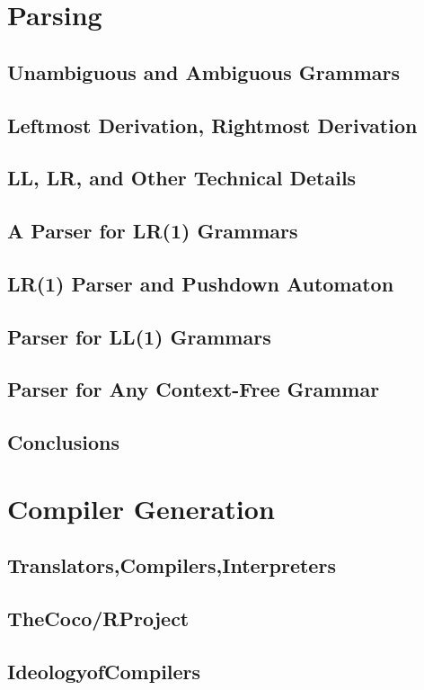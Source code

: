 \documentclass[a4paper]{article}
\begin{document}
\newpage
\section{Parsing}
\subsection{Unambiguous and Ambiguous Grammars}
\subsection{Leftmost Derivation, Rightmost Derivation}
\subsection{LL, LR, and Other Technical Details}
\subsection{A Parser for LR(1) Grammars}
\subsection{LR(1) Parser and Pushdown Automaton}
\subsection{Parser for LL(1) Grammars}
\subsection{Parser for Any Context-Free Grammar}
\subsection{Conclusions}

\newpage
\section{Compiler Generation}
\subsection{Translators,Compilers,Interpreters}
\subsection{TheCoco/RProject}
\subsection{IdeologyofCompilers}
\end{document}
